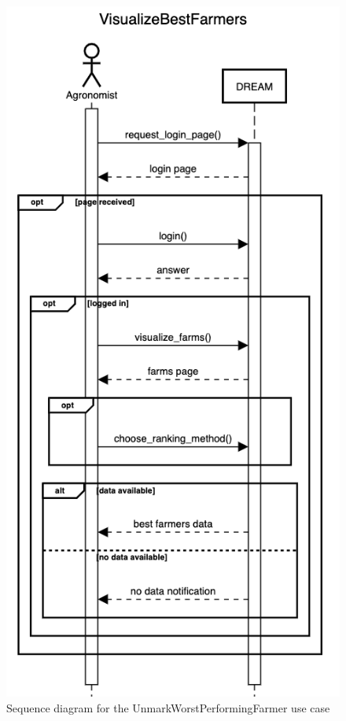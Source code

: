 \documentclass{article}
\begin{document}
\begin{figure}[H]
    \centering
	\includegraphics[scale=0.5]{sequence_diagrams/VisualizeBestFarmers}
    \caption{Sequence diagram for the UnmarkWorstPerformingFarmer use case}
\end{figure}
\end{document}
